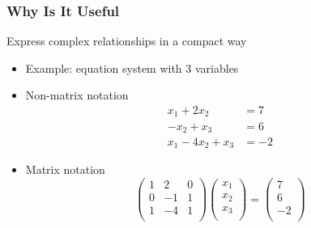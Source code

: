 \documentclass[mathserif, xcolor=table, svgnames]{beamer}
\begin{document}
\begin{frame}
\frametitle{Why Is It Useful}
\begin{description}
\item Express complex relationships in a compact way
  \begin{itemize}
  \item Example: equation system with 3 variables
  \item Non-matrix notation
    \begin{equation*}
      \begin{split}
        x_{1} + 2x_{2} &= 7 \\
        -x_{2} + x_{3} &= 6 \\
        x_{1} - 4x_{2} + x_{3} &= -2
      \end{split}
    \end{equation*}
  \item Matrix notation
    \begin{equation*}
      \begin{pmatrix}
        1 & 2 & 0\\
        0 & -1 & 1\\
        1 & -4 & 1\\
      \end{pmatrix}
      \begin{pmatrix}
        x_{1}\\
        x_{2}\\
        x_{3}\\
      \end{pmatrix}
      =
      \begin{pmatrix}
        7\\
        6\\
        -2\\
      \end{pmatrix}
    \end{equation*}
  \end{itemize}
\end{description}
\end{frame}
\end{document}
